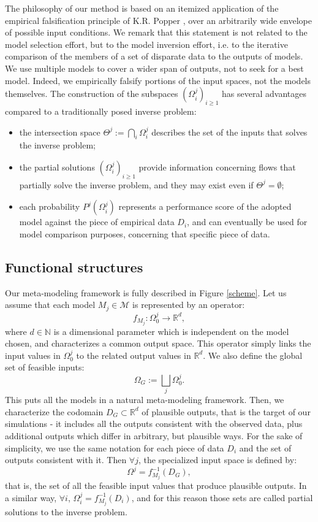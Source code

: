 \documentclass[nhess, manuscript]{copernicus}
\begin{document}
The philosophy of our method is based on an itemized application of the empirical falsification principle of K.R. Popper \citep{Popper1959}, over an arbitrarily wide envelope of possible input conditions. We remark that this statement is not related to the model selection effort, but to the model inversion effort, i.e. to the iterative comparison of the members of a set of disparate data to the outputs of models. We use multiple models to cover a wider span of outputs, not to seek for a best model. Indeed, we empirically falsify portions of the input spaces, not the models themselves. The construction of the subspaces $(\Omega^j_i)_{i\ge1}$ has several advantages compared to a traditionally posed inverse problem:
\begin{itemize}
  \item the intersection space $\Theta^j:=\bigcap_i \Omega^j_i$ describes the set of the inputs that solves the inverse problem;
  \item the partial solutions $(\Omega^j_i)_{i\ge1}$ provide information concerning flows that partially solve the inverse problem, and they may exist even if $\Theta^j=\emptyset$;
  \item each probability $P^j(\Omega^j_i)$ represents a performance score of the adopted model against the piece of empirical data $D_i$, and can eventually be used for model comparison purposes, concerning  that specific piece of data.
\end{itemize}

\subsection{Functional structures}
Our meta-modeling framework is fully described in Figure \ref{scheme}. Let us assume that each model $M_j\in\mathcal M$ is represented by an operator:
$$f_{M_j}: \Omega^j_0 \longrightarrow \mathbb R^d,$$
where $d\in\mathbb N$ is a dimensional parameter which is independent on the model chosen, and characterizes a common output space. This operator simply links the input values in $ \Omega^j_0$ to the related output values in $\mathbb R^d$. We also define the global set of feasible inputs:
$$\Omega_G:=\bigsqcup_j \Omega^j_0.$$
This puts all the models in a natural meta-modeling framework. Then, we characterize the codomain $D_G\subset \mathbb R^d$ of plausible outputs, that is the target of our simulations - it includes all the outputs consistent with the observed data, plus additional outputs which differ in arbitrary, but plausible ways. For the sake of simplicity, we use the same notation for each piece of data $D_i$ and the set of outputs consistent with it. Then $\forall j$, the specialized input space is defined by:
$$\Omega^j=f_{M_j}^{-1}\left(D_G\right),$$
that is, the set of all the feasible input values that produce plausible outputs.
In a similar way, $\forall i$, $\Omega^j_i=f_{M_j}^{-1}\left(D_i\right)$, and for this reason those sets are called partial solutions to the inverse problem.
\end{document}
